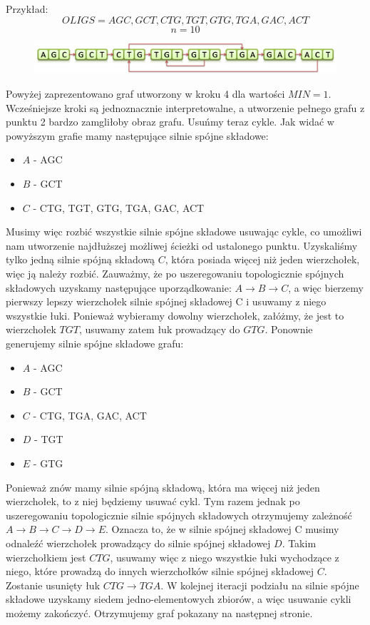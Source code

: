 \documentclass[a4paper,10pt]{article}
\begin{document}
Przykład:
$$OLIGS = { AGC, GCT, CTG, TGT, GTG, TGA, GAC, ACT }$$
$$n = 10$$

\begin{figure}[h]
  \footnotesize\centering
  \includegraphics[width=\textwidth,keepaspectratio]{Graph1.png}
\end{figure}

Powyżej zaprezentowano graf utworzony w kroku 4 dla wartości $MIN=1$. Wcześniejsze kroki są jednoznacznie interpretowalne, 
a utworzenie pełnego grafu z punktu 2 bardzo zamgliłoby obraz grafu. Usuńmy teraz cykle.
Jak widać w powyższym grafie mamy następujące silnie spójne składowe:
\begin{itemize}
 \item $A$ - {AGC}
 \item $B$ - {GCT}
 \item $C$ - {CTG, TGT, GTG, TGA, GAC, ACT}
\end{itemize}
Musimy więc rozbić wszystkie silnie spójne składowe usuwając cykle, co umożliwi nam utworzenie najdłuższej możliwej ścieżki od ustalonego punktu.
Uzyskaliśmy tylko jedną silnie spójną składową $C$, która posiada więcej niż jeden wierzchołek, więc ją należy rozbić. 
Zauważmy, że po uszeregowaniu topologicznie spójnych składowych uzyskamy następujące uporządkowanie: $A \rightarrow B \rightarrow C$, 
a więc bierzemy pierwszy lepszy wierzchołek silnie spójnej składowej C i usuwamy z niego wszystkie łuki. 
Ponieważ wybieramy dowolny wierzchołek, załóżmy, że jest to wierzchołek $TGT$, usuwamy zatem łuk prowadzący do $GTG$.
Ponownie generujemy silnie spójne składowe grafu:
\begin{itemize}
 \item $A$ - {AGC}
 \item $B$ - {GCT}
 \item $C$ - {CTG, TGA, GAC, ACT}
 \item $D$ - {TGT}
 \item $E$ - {GTG}
\end{itemize}
Ponieważ znów mamy silnie spójną składową, która ma więcej niż jeden wierzchołek, to z niej będziemy usuwać cykl. 
Tym razem jednak po uszeregowaniu topologicznie silnie spójnych składowych otrzymujemy zależność $A \rightarrow B \rightarrow C \rightarrow D \rightarrow E$. 
Oznacza to, że w silnie spójnej składowej C musimy odnaleźć wierzchołek prowadzący do silnie spójnej składowej $D$. 
Takim wierzchołkiem jest $CTG$, usuwamy więc z niego wszystkie łuki wychodzące z niego, które prowadzą do innych 
wierzchołków silnie spójnej składowej $C$. Zostanie usunięty łuk $CTG \rightarrow TGA$.
W kolejnej iteracji podziału na silnie spójne składowe uzyskamy siedem jedno-elementowych zbiorów, a więc usuwanie 
cykli możemy zakończyć. Otrzymujemy graf pokazany na następnej stronie.
\end{document}
